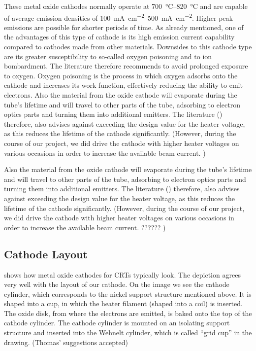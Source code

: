 These metal oxide cathodes normally operate at \SIrange{700}{820}{\celsius} and are capable of average emission densities of \SIrange{100}{500}{\milli\ampere\per\centi\meter\squared}. Higher peak emissions are possible for shorter periods of time. As already mentioned, one of the advantages of this type of cathode is its high emission current capability compared to cathodes made from other materials. Downsides to this cathode type are its greater susceptibility to so-called oxygen poisoning and to ion bombardment. The literature therefore recommends to avoid prolonged exposure to oxygen. Oxygen poisoning is the process in which oxygen adsorbs onto the cathode and increases its work function, effectively reducing the ability to emit electrons. 
Also the material from the oxide cathode will evaporate during the tube's lifetime and will travel to other parts of the tube, adsorbing to electron optics parts and turning them into additional emitters. The literature (\cite[chp 3.5.2.1]{Whitaker}) therefore, also advises against exceeding the design value for the heater voltage, as this reduces the lifetime of the cathode significantly. (However, during the course of our project, we did drive the cathode with higher heater voltages on various occasions in order to increase the available beam current. ) 

Also the material from the oxide cathode will evaporate during the tube's lifetime and will travel to other parts of the tube, adsorbing to electron optics parts and turning them into additional emitters. The literature (\cite[chp 3.5.2.1]{Whitaker}) therefore, also advises against exceeding the design value for the heater voltage, as this reduces the lifetime of the cathode significantly. (However, during the course of our project, we did drive the cathode with higher heater voltages on various occasions in order to increase the available beam current. ?????? ) 

\subsection{Cathode Layout}

 shows how metal oxide cathodes for CRTs typically look. The depiction agrees very well with the layout of our cathode. On the image we see the cathode cylinder, which corresponds to the nickel support structure mentioned above. It is shaped into a cup, in which the heater filament (shaped into a coil) is inserted. The oxide disk, from where the electrons are emitted, is baked onto the top of the cathode cylinder. The cathode cylinder is mounted on an isolating support structure and inserted into the Wehnelt cylinder, which is called ``grid cup'' in the drawing. \suggestion(Thomas' suggestions accepted)
  

